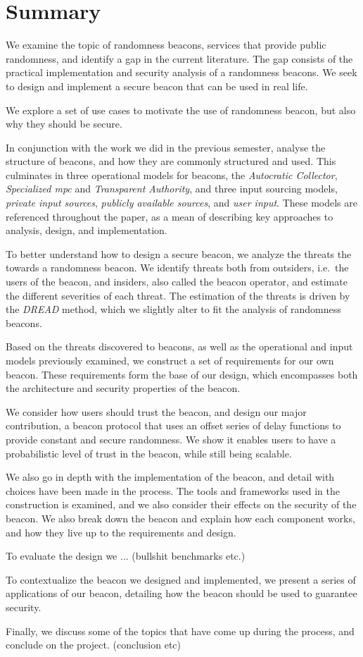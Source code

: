 \section*{Summary}
We examine the topic of randomness beacons, services that provide public randomness, and identify a gap in the current literature.
The gap consists of the practical implementation and security analysis of a randomness beacons.
We seek to design and implement a secure beacon that can be used in real life.

We explore a set of use cases to motivate the use of randomness beacon, but also why they should be secure.

In conjunction with the work we did in the previous semester, analyse the structure of beacons, and how they are commonly structured and used.
This culminates in three operational models for beacons, the \emph{Autocratic Collector}, \emph{Specialized \acrshort{mpc}} and \emph{Transparent Authority}, and three input sourcing models, \emph{private input sources}, \emph{publicly available sources}, and \emph{user input}.
These models are referenced throughout the paper, as a mean of describing key approaches to analysis, design, and implementation.

To better understand how to design a secure beacon, we analyze the threats the towards a randomness beacon.
We identify threats both from outsiders, i.e.\ the users of the beacon, and insiders, also called the beacon operator, and estimate the different severities of each threat.
The estimation of the threats is driven by the \emph{DREAD} method, which we slightly alter to fit the analysis of randomness beacons.

Based on the threats discovered to beacons, as well as the operational and input models previously examined, we construct a set of requirements for our own beacon.
These requirements form the base of our design, which encompasses both the architecture and security properties of the beacon.

We consider how users should trust the beacon, and design our major contribution, a beacon protocol that uses an offset series of delay functions to provide constant and secure randomness.
We show it enables users to have a probabilistic level of trust in the beacon, while still being scalable.

We also go in depth with the implementation of the beacon, and detail with choices have been made in the process.
The tools and frameworks used in the construction is examined, and we also consider their effects on the security of the beacon.
We also break down the beacon and explain how each component works, and how they live up to the requirements and design.

To evaluate the design we ... (bullshit benchmarks etc.)

To contextualize the beacon we designed and implemented, we present a series of applications of our beacon, detailing how the beacon should be used to guarantee security.

Finally, we discuss some of the topics that have come up during the process, and conclude on the project. (conclusion etc)
